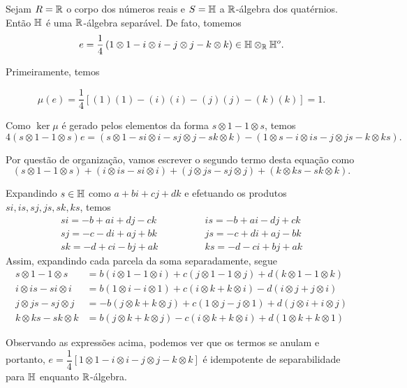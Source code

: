 \begin{exemplo}
Sejam $R = \mathbb{R}$ o corpo dos números reais e $S = \mathbb{H} $ a $\mathbb{R}$-álgebra dos quatérnios. Então $\mathbb{H}$ é uma $\mathbb{R}$-álgebra separável. De fato, tomemos \[e = \dfrac{1}{4}\left( 1\otimes1 - i \otimes i - j \otimes j - k \otimes k \right) \in \mathbb{H} \otimes_{\mathbb{R}} \mathbb{H}^{o}.\]

Primeiramente, temos

\[\mu(e) = \dfrac{1}{4}\left[(1)(1) - (i)(i) - (j)(j) - (k)(k)\right] = 1.\]

Como $\ker \mu$ é gerado pelos elementos da forma $s\otimes 1 - 1 \otimes s$, temos
\[4(s\otimes 1 - 1 \otimes s)e = (s\otimes 1 - si\otimes i - sj\otimes j - sk\otimes k) - (1\otimes s - i\otimes is - j \otimes js - k\otimes ks).\]

Por questão de organização, vamos escrever o segundo termo desta equação como
\[ (s\otimes 1 - 1 \otimes s) + (i \otimes is - si \otimes i) + (j \otimes js - sj \otimes j) + (k \otimes ks - sk \otimes k).\]

Expandindo $s \in \mathbb{H}$ como $a + bi + cj + dk$ e efetuando os produtos $si, is, sj, js, sk, ks$, temos
\begin{align*}
    si = -b + ai + dj - ck \qquad&\qquad
    is = -b + ai - dj + ck \\
    sj = -c - di + aj + bk \qquad&\qquad
    js = -c + di + aj - bk \\
    sk = -d + ci - bj + ak \qquad&\qquad
    ks = -d - ci + bj + ak 
\end{align*}
Assim, expandindo cada parcela da soma separadamente, segue
\begin{align*}
    s\otimes 1 - 1 \otimes s &= b(i \otimes 1 - 1 \otimes i) + c (j \otimes 1 - 1 \otimes j) + d (k \otimes 1 - 1 \otimes k) \\
    i \otimes is - si \otimes i &= b(1 \otimes i - i \otimes 1) + c(i \otimes k + k \otimes i) - d (i \otimes j + j \otimes i) \\
    j\otimes js - sj \otimes j &= -b(j\otimes k + k \otimes j) + c (1\otimes j - j \otimes 1) + d (j \otimes i + i \otimes j) \\
    k\otimes ks - sk \otimes k &= b (j\otimes k + k \otimes j) - c(i \otimes k + k \otimes i) + d (1 \otimes k + k \otimes 1)
\end{align*}

Observando as expressões acima, podemos ver que os termos se anulam e portanto, $e = \dfrac{1}{4}[1 \otimes 1 - i \otimes i - j \otimes j - k \otimes k]$ é idempotente de separabilidade para $\mathbb{H}$ enquanto $\mathbb{R}$-álgebra.


\end{exemplo}
